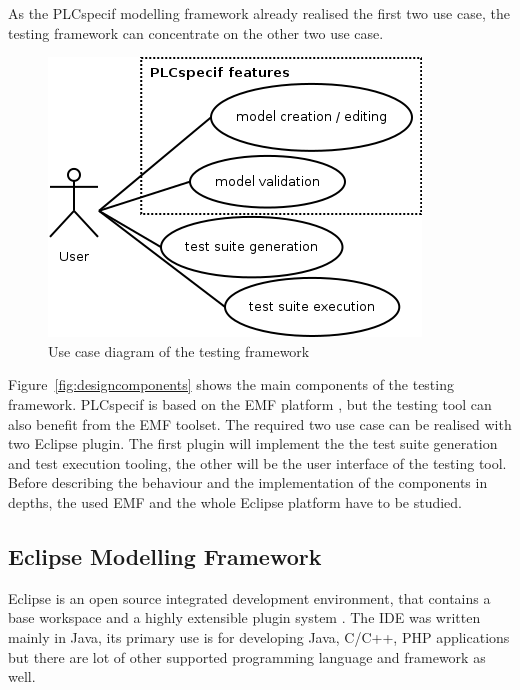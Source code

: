 As the PLCspecif modelling framework already realised the first two use case, the testing framework can concentrate on the other two use case.

\begin{figure}[htp]
\centering
\includegraphics[scale=0.6]{figures/design_uc.png}
\caption{Use case diagram of the testing framework}
\label{fig:designuc}
\end{figure}

Figure~\ref{fig:designcomponents} shows the main components of the testing framework. PLCspecif is based on the EMF platform \cite{emf}\cite{emfbook}, but the testing tool can also benefit from the EMF toolset. The required two use case can be realised with two Eclipse plugin. The first plugin will implement the the test suite generation and test execution tooling, the other will be the user interface of the testing tool. Before describing the behaviour and the implementation of the components in depths, the used EMF and the whole Eclipse platform have to be studied.

\newpage

\subsection{Eclipse Modelling Framework}
\label{sub:emf}

Eclipse is an open source integrated development environment, that contains a base workspace and a highly extensible plugin system \cite{aosa}. The IDE was written mainly in Java, its primary use is for developing Java, C/C++, PHP applications but there are lot of other supported programming language and framework as well.

